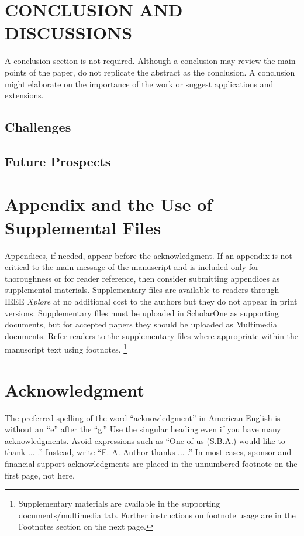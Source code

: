 \documentclass[journal,twoside,web]{ieeecolor}
\begin{document}
\section{CONCLUSION AND DISCUSSIONS}
A conclusion section is not required. Although a conclusion may review the 
main points of the paper, do not replicate the abstract as the conclusion.
A conclusion might elaborate on the importance of the work or suggest 
applications and extensions.
\subsection{Challenges}

\subsection{Future Prospects}





\appendices

\section*{Appendix and the Use of Supplemental Files}
Appendices, if needed, appear before the acknowledgment. If an appendix is not
critical to the main message of the manuscript and is included only for thoroughness
or for reader reference, then consider submitting appendices as supplemental materials.
Supplementary files are available to readers through IEEE \emph{Xplore\textregistered}
at no additional cost to the authors but they do not appear in print versions.
Supplementary files must be uploaded in ScholarOne as supporting documents, but for
accepted papers they should be uploaded as Multimedia documents. Refer readers
to the supplementary files where appropriate within the manuscript text using footnotes.
\footnote{Supplementary materials are available in the supporting documents/multimedia tab.
Further instructions on footnote usage are in the Footnotes section on the next page.}

\section*{Acknowledgment}
The preferred spelling of the word ``acknowledgment'' in American English is 
without an ``e'' after the ``g.'' Use the singular heading even if you have 
many acknowledgments. Avoid expressions such as ``One of us (S.B.A.) would 
like to thank $\ldots$ .'' Instead, write ``F. A. Author thanks $\ldots$ .'' In most 
cases, sponsor and financial support acknowledgments are placed in the 
unnumbered footnote on the first page, not here.

% 


\end{document}
